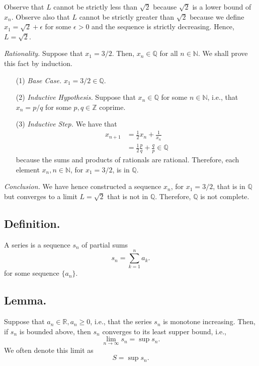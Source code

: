 \documentclass[titlepage]{article}
\begin{document}
Observe that $L$ cannot be strictly less than $\sqrt{2}$ because $\sqrt{2}$ is a lower bound of $x_{n}$. Observe also that $L$ cannot be strictly greater than $\sqrt{2}$ because we define $x_{1} = \sqrt{2} + \epsilon$ for some $\epsilon > 0$ and the sequence is strictly decreasing. Hence, $L = \sqrt{2}$.

\textit{Rationality.} Suppose that $x_{1} = 3/2$. Then, $x_{n} \in \mathbb{Q}$ for all $n \in \mathbb{N}$. We shall prove this fact by induction. 
\begin{enumerate}
\item[(1)] \textit{Base Case.} $x_{1} = 3/2 \in \mathbb{Q}$.
\item[(2)] \textit{Inductive Hypothesis.} Suppose that $x_{n} \in \mathbb{Q}$ for some $n \in \mathbb{N}$, i.e., that $x_{n} = p/q$ for some $p,q \in \mathbb{Z}$ coprime.
\item[(3)] \textit{Inductive Step.} We have that 
\begin{align*}
    x_{n+1} &= \frac{1}{2}x_{n} + \frac{1}{x_{n}} \\
            &= \frac{1}{2}\frac{p}{q} + \frac{q}{p} \in \mathbb{Q}
\end{align*}
because the sums and products of rationals are rational. Therefore, each element $x_{n}, n \in \mathbb{N}$, for 
$x_{1} = 3/2$, is in $\mathbb{Q}$.
\end{enumerate}

\textit{Conclusion.} We have hence constructed a sequence $x_{n}$, for $x_{1} = 3/2$, that is in $\mathbb{Q}$ but converges to a limit $L = \sqrt{2}$ that is not in $\mathbb{Q}$. Therefore, $\mathbb{Q}$ is not complete.

\subsection{Definition.} A series is a sequence $s_{n}$ of partial sums 
$$s_{n} = \sum_{k=1}^{n}a_{k}.$$
for some sequence $\{a_{n}\}$.

\subsection{Lemma.} Suppose that $a_{n} \in \mathbb{R}, a_{n} \geq 0$, i.e., that the series $s_{n}$ is monotone increasing. Then, if $s_{n}$ is bounded above, then $s_{n}$ converges to its least supper bound, i.e., 
$$\lim_{n \to \infty}s_{n} = \sup s_{n}.$$
We often denote this limit as 
$$S = \sup s_{n}.$$

\newpage {}
\end{document}
